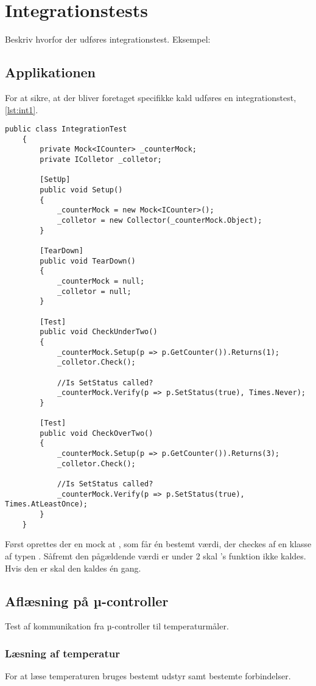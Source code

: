 \documentclass[Main]{subfiles}
\begin{document}
\chapter{Integrationstests}

Beskriv hvorfor der udføres integrationstest.
Eksempel:

\section{Applikationen}
For at sikre, at der bliver foretaget specifikke kald udføres en integrationstest, \codeTitle \ref{lst:int1}.

\begin{lstlisting}[caption=Integrationstest, style=Code-Java, label=lst:int1]
	public class IntegrationTest
	{
		private Mock<ICounter> _counterMock;
		private IColletor _colletor;

		[SetUp]
		public void Setup()
		{
			_counterMock = new Mock<ICounter>();
			_colletor = new Collector(_counterMock.Object);
		}

		[TearDown]
		public void TearDown()
		{
			_counterMock = null;
			_colletor = null;
		}

		[Test]
		public void CheckUnderTwo()
		{
			_counterMock.Setup(p => p.GetCounter()).Returns(1);
			_colletor.Check();
			
			//Is SetStatus called?
			_counterMock.Verify(p => p.SetStatus(true), Times.Never);
		}

		[Test]
		public void CheckOverTwo()
		{
			_counterMock.Setup(p => p.GetCounter()).Returns(3);
			_colletor.Check();
			
			//Is SetStatus called?
			_counterMock.Verify(p => p.SetStatus(true), Times.AtLeastOnce);
		}
	}
\end{lstlisting}

Først oprettes der en mock at , som får én bestemt værdi, der checkes af en  klasse af typen . 
Såfremt den pågældende værdi er under 2 skal 's funktion ikke kaldes.
Hvis den er skal den kaldes én gang.






\section{Aflæsning på µ-controller}
Test af kommunikation fra µ-controller til temperaturmåler.

\subsection{Læsning af temperatur}
For at læse temperaturen bruges bestemt udstyr samt bestemte forbindelser.
\end{document}
